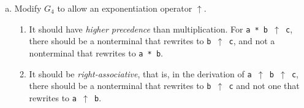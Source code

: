 \documentclass{article}
\begin{document}
\begin{enumerate}[(a)]
\begin{enumerate}[(i)]
                    \item \texttt{a * (b + c)}

                        \begin{tabular}{ll}
                            $E$ & $\Longrightarrow T$ \\
                                & $\Longrightarrow T \star F$ \\
                                & $\Longrightarrow T \star (E)$ \\
                                & $\Longrightarrow T \star (E + T)$ \\ 
                                & $\Longrightarrow T \star (T + T)$ \\ 
                                & $\Longrightarrow F \star (T + T)$ \\ 
                                & $\Longrightarrow F \star (F + T)$ \\ 
                                & $\Longrightarrow F \star (F + F)$ \\ 
                                & $\Longrightarrow \texttt{a} \star (F + F)$ \\ 
                                & $\Longrightarrow \texttt{a} \star (\texttt{b} + F)$ \\ 
                                & $\Longrightarrow \texttt{a} \star (\texttt{b} + \texttt{c})$ \\ 

                        \end{tabular}
                \end{enumerate}

            \item Modify $G_4$ to allow an exponentiation operator $\uparrow$.
                \begin{enumerate}
                    \item It should have \textit{higher precedence} than multiplication. For \texttt{a * b $\uparrow$ c}, there should be a nonterminal that rewrites to \texttt{b $\uparrow$ c}, and not a nonterminal that rewrites to \texttt{a * b}.

                    \item It should be \textit{right-associative}, that is, in the derivation of \texttt{a $\uparrow$ b $\uparrow$ c}, there should be a nonterminal that rewrites to \texttt{b $\uparrow$ c} and not one that rewrites to \texttt{a $\uparrow$ b}. 
                \end{enumerate}


\end{enumerate}
\end{document}
